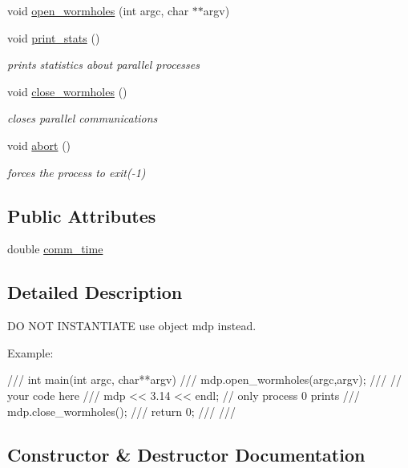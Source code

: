 \begin{DoxyCompactItemize}
void \hyperlink{classmdp__communicator_af2c43869a689b8f1d020d4c4995b0cee}{open\+\_\+wormholes} (int argc, char $\ast$$\ast$argv)
\item 
void \hyperlink{classmdp__communicator_a33ee55b0c67b1f63fd3a100e36fcc35e}{print\+\_\+stats} ()
\begin{DoxyCompactList}\small\item\em prints statistics about parallel processes \end{DoxyCompactList}\item 
void \hyperlink{classmdp__communicator_ad9941f7db0a5a447e37e8372b15f83f9}{close\+\_\+wormholes} ()
\begin{DoxyCompactList}\small\item\em closes parallel communications \end{DoxyCompactList}\item 
void \hyperlink{classmdp__communicator_aa601b7788f242a7f71b955a6bdf7e002}{abort} ()
\begin{DoxyCompactList}\small\item\em forces the process to exit(-\/1) \end{DoxyCompactList}\end{DoxyCompactItemize}
\subsection*{Public Attributes}
\begin{DoxyCompactItemize}
\item 
double \hyperlink{classmdp__communicator_a0292893d19938e48bac585bdff3d7831}{comm\+\_\+time}
\end{DoxyCompactItemize}


\subsection{Detailed Description}
DO N\+OT I\+N\+S\+T\+A\+N\+T\+I\+A\+TE use object mdp instead. 

Example\+: \begin{DoxyVerb}/// int main(int argc, char**argv) {
///    mdp.open_wormholes(argc,argv);
///    // your code here
///    mdp << 3.14 << endl;  // only process 0 prints
///    mdp.close_wormholes();
///    return 0;
/// }
/// \end{DoxyVerb}
 

\subsection{Constructor \& Destructor Documentation}
\mbox{\label{classmdp__communicator_a9c38d613d17973364b3121d8e8b03301}} 
